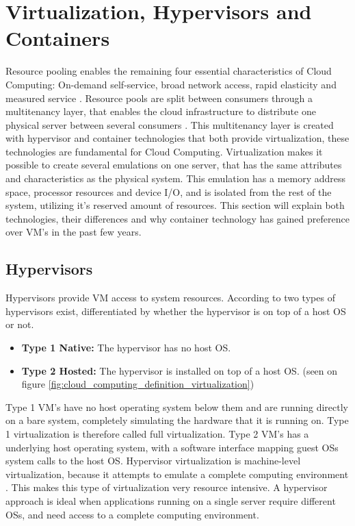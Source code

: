 
\section{Virtualization, Hypervisors and Containers}
\label{sec:virtualization}
Resource pooling enables the remaining four essential characteristics of Cloud Computing: On-demand self-service, broad network access, rapid elasticity and measured service \cite{bittman2009server}. Resource pools are split  between consumers through a multitenancy layer, that enables the cloud infrastructure to distribute one physical server between several consumers \cite{krebs2012architectural}. This multitenancy layer is created with hypervisor and container technologies that both provide virtualization, these technologies are fundamental for Cloud Computing. Virtualization makes it possible to create several emulations on one server, that has the same attributes and characteristics as the physical system. This emulation has a memory address space, processor resources and device I/O, and is isolated from the rest of the system, utilizing it's reserved amount of resources. This section will explain both technologies, their differences and why container technology has gained preference over VM's in the past few years.

\subsection{Hypervisors}
Hypervisors provide VM access to system resources. According to \cite[p.~100]{sosinsky2010cloud} two types of hypervisors exist, differentiated by whether the hypervisor is on top of a host OS or not.

\begin{itemize}
	\item \textbf{Type 1 Native:} The hypervisor has no host OS.
	\item \textbf{Type 2 Hosted:} The hypervisor is installed on top of a host OS. (seen on figure \ref{fig:cloud_computing_definition_virtualization})
\end{itemize}

Type 1 VM's have no host operating system below them and are running directly on a bare system, completely simulating the hardware that it is running on. Type 1 virtualization is therefore called full virtualization. Type 2 VM's has a underlying host operating system, with a software interface mapping guest OSs system calls to the host OS. Hypervisor virtualization is machine-level virtualization, because it attempts to emulate a complete computing environment \cite{fink2014docker}. This makes this type of virtualization very resource intensive. A hypervisor approach is ideal when applications running on a single server require different OSs, and need access to a complete computing environment.

